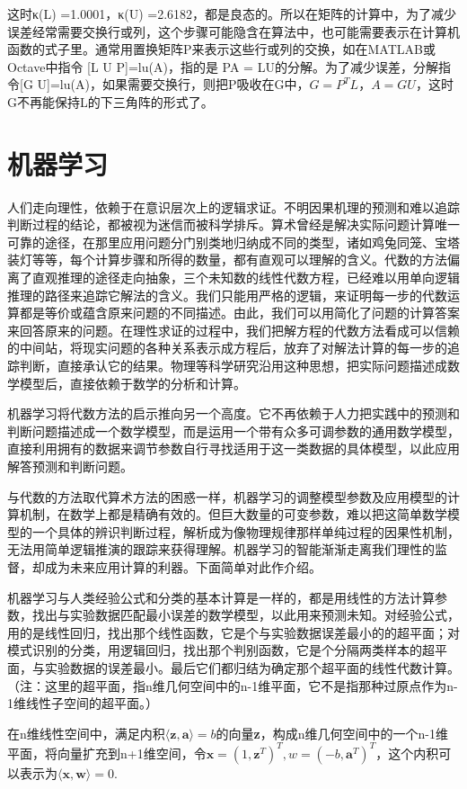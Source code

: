 这时κ(L) =1.0001，κ(U) =2.6182，都是良态的。所以在矩阵的计算中，为了减少误差经常需要交换行或列，这个步骤可能隐含在算法中，也可能需要表示在计算机函数的式子里。通常用置换矩阵P来表示这些行或列的交换，如在MATLAB或Octave中指令 [L U P]=lu(A)，指的是 PA = LU的分解。为了减少误差，分解指令[G U]=lu(A)，如果需要交换行，则把P吸收在G中，$ G=P^{T}L，A=GU $，这时G不再能保持L的下三角阵的形式了。

\section{机器学习}

人们走向理性，依赖于在意识层次上的逻辑求证。不明因果机理的预测和难以追踪判断过程的结论，都被视为迷信而被科学排斥。算术曾经是解决实际问题计算唯一可靠的途径，在那里应用问题分门别类地归纳成不同的类型，诸如鸡兔同笼、宝塔装灯等等，每个计算步骤和所得的数量，都有直观可以理解的含义。代数的方法偏离了直观推理的途径走向抽象，三个未知数的线性代数方程，已经难以用单向逻辑推理的路径来追踪它解法的含义。我们只能用严格的逻辑，来证明每一步的代数运算都是等价或蕴含原来问题的不同描述。由此，我们可以用简化了问题的计算答案来回答原来的问题。在理性求证的过程中，我们把解方程的代数方法看成可以信赖的中间站，将现实问题的各种关系表示成方程后，放弃了对解法计算的每一步的追踪判断，直接承认它的结果。物理等科学研究沿用这种思想，把实际问题描述成数学模型后，直接依赖于数学的分析和计算。

机器学习将代数方法的启示推向另一个高度。它不再依赖于人力把实践中的预测和判断问题描述成一个数学模型，而是运用一个带有众多可调参数的通用数学模型，直接利用拥有的数据来调节参数自行寻找适用于这一类数据的具体模型，以此应用解答预测和判断问题。

与代数的方法取代算术方法的困惑一样，机器学习的调整模型参数及应用模型的计算机制，在数学上都是精确有效的。但巨大数量的可变参数，难以把这简单数学模型的一个具体的辨识判断过程，解析成为像物理规律那样单纯过程的因果性机制，无法用简单逻辑推演的跟踪来获得理解。机器学习的智能渐渐走离我们理性的监督，却成为未来应用计算的利器。下面简单对此作介绍。

机器学习与人类经验公式和分类的基本计算是一样的，都是用线性的方法计算参数，找出与实验数据匹配最小误差的数学模型，以此用来预测未知。对经验公式，用的是线性回归，找出那个线性函数，它是个与实验数据误差最小的的超平面；对模式识别的分类，用逻辑回归，找出那个判别函数，它是个分隔两类样本的超平面，与实验数据的误差最小。最后它们都归结为确定那个超平面的线性代数计算。（注：这里的超平面，指n维几何空间中的n-1维平面，它不是指那种过原点作为n-1维线性子空间的超平面。）

在n维线性空间中，满足内积$\langle \mathbf{z},\mathbf{a}\rangle = b $的向量\textbf{z}，构成n维几何空间中的一个n-1维平面，将向量扩充到n+1维空间，令$ \mathbf{x}=(1,\mathbf{z}^T)^T, w=(-b,\mathbf{a}^T)^T $，这个内积可以表示为$ \langle \mathbf{x},\mathbf{w}\rangle= 0 $.

